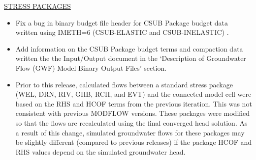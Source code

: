 \documentclass[11pt,twoside,twocolumn]{usgsreport}
\begin{document}
\begin{itemize}
	\underline{STRESS PACKAGES}
	\begin{itemize}
		\item Fix a bug in binary budget file header for CSUB Package budget data written using IMETH=6 (CSUB-ELASTIC and CSUB-INELASTIC) .
		\item Add information on the CSUB Package budget terms and compaction data written the the Input/Output document in the `Description of Groundwater Flow (GWF) Model Binary Output Files' section.
		\item Prior to this release, calculated flows between a standard stress package (WEL, DRN, RIV, GHB, RCH, and EVT) and the connected model cell were based on the RHS and HCOF terms from the previous iteration.  This was not consistent with previous MODFLOW versions.  These packages were modified so that the flows are recalculated using the final converged head solution.  As a result of this change, simulated groundwater flows for these packages may be slightly different (compared to previous releases) if the package HCOF and RHS values depend on the simulated groundwater head.
	\end{itemize}


\end{itemize}
\end{document}
